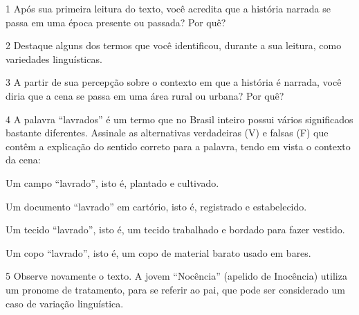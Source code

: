 
\num{1} Após sua primeira leitura do texto, você acredita que a história
narrada se passa em uma época presente ou passada? Por quê?



\num{2} Destaque alguns dos termos que você identificou, durante a sua
leitura, como variedades linguísticas.



\num{3} A partir de sua percepção sobre o contexto em que a história é
narrada, você diria que a cena se passa em uma área rural ou urbana? Por
quê?



\num{4} A palavra ``lavrados'' é um termo que no Brasil inteiro possui
vários significados bastante diferentes. Assinale as alternativas
verdadeiras (V) e falsas (F) que contêm a explicação do sentido correto
para a palavra, tendo em vista o contexto da cena:

\begin{boxlist}
\item Um campo ``lavrado'', isto é, plantado e cultivado. 

\item Um documento ``lavrado'' em cartório, isto é, registrado e estabelecido. 

\item Um tecido ``lavrado'', isto é, um tecido trabalhado e bordado para fazer vestido. 

\item Um copo ``lavrado'', isto é, um copo de material barato usado em bares. 
\end{boxlist}

\num{5} Observe novamente o texto. A jovem ``Nocência'' (apelido de
Inocência) utiliza um pronome de tratamento, para se referir ao pai, que
pode ser considerado um caso de variação linguística.

